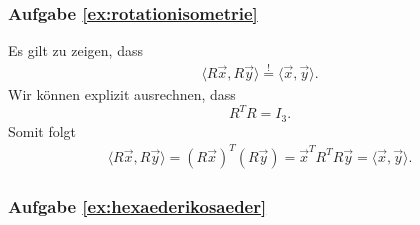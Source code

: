 \subsubsection*{Aufgabe \ref{ex:rotationisometrie}}
Es gilt zu zeigen, dass
\begin{align}
    \langle R\vec{x}, R\vec{y} \rangle \overset{!}{=} \langle \vec{x}, \vec{y} \rangle .\nonumber
\end{align}
Wir können explizit ausrechnen, dass
$$R^T R = I_3.$$
Somit folgt
\begin{align}
    \langle R\vec{x}, R\vec{y} \rangle = (R\vec{x})^T (R\vec{y}) = \vec{x}^T R^T R \vec{y} = \langle \vec{x}, \vec{y} \rangle .\nonumber
\end{align}


\subsubsection*{Aufgabe \ref{ex:hexaederikosaeder}}
